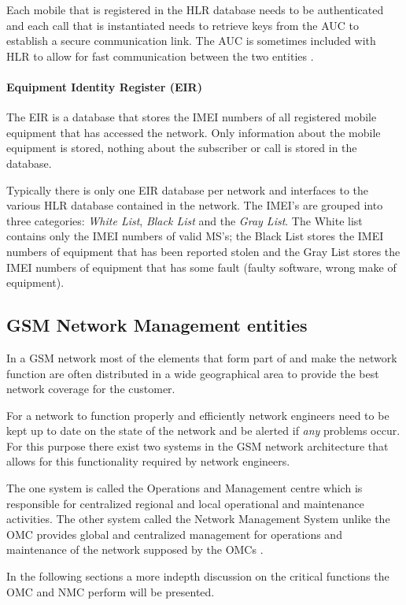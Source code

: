Each mobile that is registered in the HLR database needs to be authenticated and each call that is instantiated needs to retrieve keys from the AUC to establish a secure communication link\cite{GSM92,GSMSysEngin}. The AUC is sometimes included with HLR to allow for fast communication between the two entities \cite{GSMSysEngin}.

\paragraph{Equipment Identity Register (EIR)}
The EIR is a database that stores the IMEI numbers of all registered mobile equipment that has accessed the network. Only information about the mobile equipment is stored, nothing about the subscriber or call is stored in the database.

Typically there is only one EIR database per network and interfaces to the various HLR database contained in the network. The IMEI's are grouped into three categories: \emph{White List}, \emph{Black List} and the \emph{Gray List}. The White list contains only the IMEI numbers of valid MS's; the Black List stores the IMEI numbers of equipment that has been reported stolen and the Gray List stores the IMEI numbers of equipment that has some fault (faulty software, wrong make of equipment).

\subsection{GSM Network Management entities}
In a GSM network most of the elements that form part of and make the network function are often distributed in a wide geographical area to provide the best network coverage for the customer. 

For a network to function properly and efficiently network engineers need to be kept up to date on the state of the network and be alerted if \emph{any} problems occur. For this purpose there exist two systems in the GSM network architecture that allows for this functionality required by network engineers. 

The one system is called the Operations and Management centre which is responsible for centralized regional and local operational and maintenance activities. The other system called the Network Management System unlike the OMC provides global and centralized management for operations and maintenance of the network supposed by the OMCs \cite{GSMSysEngin}.

In the following sections a more indepth discussion on the critical functions the OMC and NMC perform will be presented.

